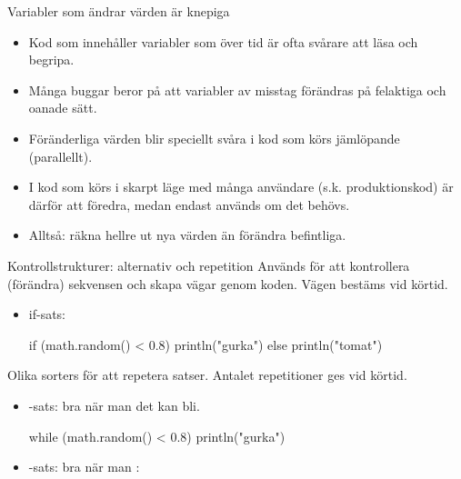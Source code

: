 \documentclass{simpleslides}
\begin{document}
    
    
\begin{Slide}{Variabler som ändrar värden är knepiga}
\begin{itemize}
\item Kod som innehåller variabler som  över tid är ofta svårare att läsa och begripa.

\item Många buggar beror på att variabler av misstag förändras på felaktiga och oanade sätt.

\item Föränderliga värden blir speciellt svåra i kod som körs jämlöpande (parallellt).

\item I kod som körs i skarpt läge med många användare (s.k. produktionskod) är därför  att föredra, medan  endast används om det  behövs.
\item Alltså: räkna hellre ut nya värden än förändra befintliga.
\end{itemize}
\end{Slide}
    
    
    
\begin{Slide}{Kontrollstrukturer: alternativ och repetition}\SlideFontSmall
Används för att kontrollera (förändra) sekvensen och skapa  vägar genom koden. Vägen  bestäms vid körtid.
\begin{itemize}
\item if-sats:
\begin{Code}
if (math.random() < 0.8) println("gurka") else println("tomat")
\end{Code}
\end{itemize}

Olika sorters  för att repetera satser. Antalet repetitioner ges vid körtid.
\begin{itemize}
\item {}-sats: bra när man  det kan bli.
\begin{Code}
while (math.random() < 0.8) println("gurka")
\end{Code}

\item {}-sats: bra när man :

\end{itemize}
\end{Slide}
    
\end{document}
